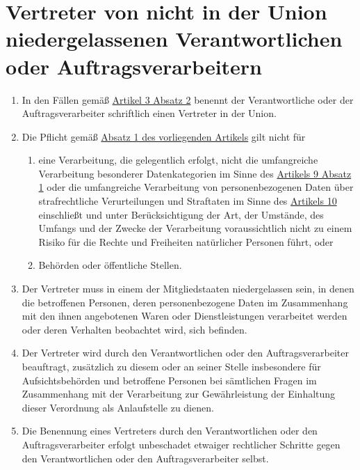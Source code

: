 \chapter{Vertreter von nicht in der Union niedergelassenen Verantwortlichen oder Auftragsverarbeitern}
\label{ch:27}


\begin{enumerate}

  \item In den Fällen gemäß \hyperref[itm:03-2]{Artikel 3 Absatz 2} benennt der Verantwortliche oder der
   Auftragsverarbeiter schriftlich einen Vertreter in der Union.
  \label{itm:27-1}

  \item Die Pflicht gemäß \hyperref[itm:27-1]{Absatz 1 des vorliegenden Artikels} gilt nicht für
  \label{itm:27-2}

  \begin{enumerate}
  
    \item eine Verarbeitung, die gelegentlich erfolgt, nicht die umfangreiche Verarbeitung besonderer Datenkategorien im
     Sinne des \hyperref[itm:09-1]{Artikels 9 Absatz 1} oder die umfangreiche Verarbeitung von personenbezogenen Daten
     über strafrechtliche Verurteilungen und Straftaten im Sinne des \hyperref[ch:10]{Artikels 10} einschließt und
     unter Berücksichtigung der Art, der Umstände, des Umfangs und der Zwecke der Verarbeitung voraussichtlich nicht zu
     einem Risiko für die Rechte und Freiheiten natürlicher Personen führt, oder
    \label{itm:27-2a}

    \item Behörden oder öffentliche Stellen.
    \label{itm:27-2b}

  \end{enumerate}

  \item Der Vertreter muss in einem der Mitgliedstaaten niedergelassen sein, in denen die betroffenen Personen, deren
   personenbezogene Daten im Zusammenhang mit den ihnen angebotenen Waren oder Dienstleistungen verarbeitet werden oder
   deren Verhalten beobachtet wird, sich befinden.
  \label{itm:27-3}

  \item Der Vertreter wird durch den Verantwortlichen oder den Auftragsverarbeiter beauftragt, zusätzlich zu diesem oder
   an seiner Stelle insbesondere für Aufsichtsbehörden und betroffene Personen bei sämtlichen Fragen im Zusammenhang
   mit der Verarbeitung zur Gewährleistung der Einhaltung dieser Verordnung als Anlaufstelle zu dienen.
  \label{itm:27-4}

  \item Die Benennung eines Vertreters durch den Verantwortlichen oder den Auftragsverarbeiter erfolgt unbeschadet
   etwaiger rechtlicher Schritte gegen den Verantwortlichen oder den Auftragsverarbeiter selbst.
  \label{itm:27-5}

\end{enumerate}


